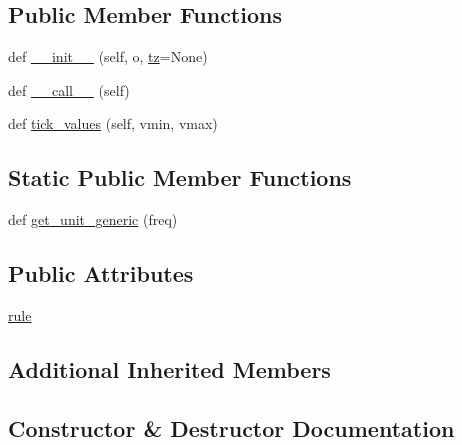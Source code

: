 \subsection*{Public Member Functions}
\begin{DoxyCompactItemize}
\item 
def \hyperlink{classmatplotlib_1_1dates_1_1RRuleLocator_ac5c9b1b00e3927129c176439c7eb531d}{\+\_\+\+\_\+init\+\_\+\+\_\+} (self, o, \hyperlink{classmatplotlib_1_1dates_1_1DateLocator_aa18faf34dbf00ed4820535b64cd7194e}{tz}=None)
\item 
def \hyperlink{classmatplotlib_1_1dates_1_1RRuleLocator_ac68a3fbbd8ced512eecf6b3973be6342}{\+\_\+\+\_\+call\+\_\+\+\_\+} (self)
\item 
def \hyperlink{classmatplotlib_1_1dates_1_1RRuleLocator_a23838fe0ca05a49dc311693231dd8d13}{tick\+\_\+values} (self, vmin, vmax)
\end{DoxyCompactItemize}
\subsection*{Static Public Member Functions}
\begin{DoxyCompactItemize}
\item 
def \hyperlink{classmatplotlib_1_1dates_1_1RRuleLocator_ab7356045f6cfda9b56dfc7683a5f9e94}{get\+\_\+unit\+\_\+generic} (freq)
\end{DoxyCompactItemize}
\subsection*{Public Attributes}
\begin{DoxyCompactItemize}
\item 
\hyperlink{classmatplotlib_1_1dates_1_1RRuleLocator_a2226665c7c44bdf1de31f2c8a8541eeb}{rule}
\end{DoxyCompactItemize}
\subsection*{Additional Inherited Members}


\subsection{Constructor \& Destructor Documentation}
\mbox{\label{classmatplotlib_1_1dates_1_1RRuleLocator_ac5c9b1b00e3927129c176439c7eb531d}} 
